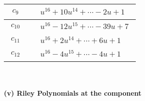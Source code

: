 \documentclass[1p]{elsarticle_modified}
\theoremstyle{definition}
\begin{document}
\begin{tabular}{m{50pt}|m{274pt}}
\hline $$\begin{aligned}c_{9}\end{aligned}$$&$\begin{aligned}
&u^{16}+10 u^{14}+\cdots-2 u+1
\end{aligned}$\\
\hline $$\begin{aligned}c_{10}\end{aligned}$$&$\begin{aligned}
&u^{16}-12 u^{15}+\cdots-39 u+7
\end{aligned}$\\
\hline $$\begin{aligned}c_{11}\end{aligned}$$&$\begin{aligned}
&u^{16}+2 u^{14}+\cdots+6 u+1
\end{aligned}$\\
\hline $$\begin{aligned}c_{12}\end{aligned}$$&$\begin{aligned}
&u^{16}-4 u^{15}+\cdots-4 u+1
\end{aligned}$\\
\hline
\end{tabular}\\~\\
\newpage\renewcommand{\arraystretch}{1}
\flushleft \textbf{(v) Riley Polynomials at the component}\newline \\
\end{document}
